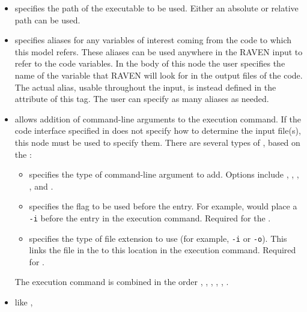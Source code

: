 \subnodesIntro
%
\begin{itemize}
  \item {}  specifies the path
  of the executable to be used.
  \nb Either an absolute or relative path can be used.
  \item {}  specifies aliases for
  any variables of interest coming from the code to which this model refers.
  These aliases can be used anywhere in the RAVEN input to refer to the code
  variables.
  In the body of this node the user specifies the name of the variable that
  RAVEN will look for in the output files of the code.
  The actual alias, usable throughout the input, is instead defined in the
   attribute of this tag.
  \nb The user can specify as many aliases as needed.
  \item {}  allows addition of
  command-line arguments to the execution command.  If the code interface
  specified in   does not specify how to
  determine the input file(s), this node must be used to specify them.
  There are several types of , based on the :
  \begin{itemize}
    \item {}  specifies the type of
    command-line argument to add.  Options include ,
    , , , and
    .
    \item {}  specifies the flag to
    be used before the entry.  For example,  would
    place a \texttt{-i} before the entry in the execution command.  Required for
    the  .
    \item {}  specifies the type
    of file extension to use (for example, \texttt{-i} or \texttt{-o}).  This links the
     file in the  to this location in the execution
    command.  Required for  .
  \end{itemize}
  The execution command is combined in the order ,
  , , , ,
  .
  \item {}  like ,

\end{itemize}
